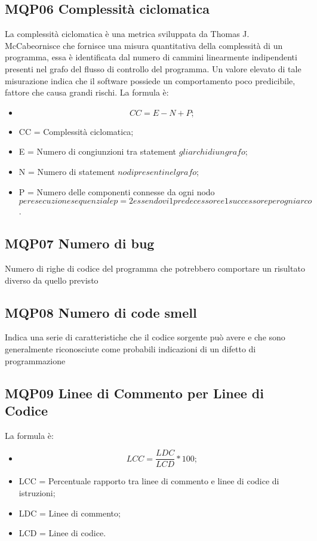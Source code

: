 \subsection{MQP06 Complessità ciclomatica}
La complessità ciclomatica è una metrica sviluppata da Thomas J. McCabeornisce che fornisce una misura quantitativa della complessità di un programma, essa è identificata dal numero di cammini linearmente indipendenti presenti nel grafo del flusso di controllo del programma. Un valore elevato di tale misurazione indica che il software possiede un comportamento poco predicibile, fattore che causa grandi rischi.
La formula è:
\begin{itemize}
  \item[] \[CC 	= E - N + P;\]
  \item CC = Complessità ciclomatica;
  \item E = Numero di congiunzioni tra statement \(gli archi di un grafo\);
  \item N = Numero di statement \(nodi presenti nel grafo\);
  \item P = Numero delle componenti connesse da ogni nodo \(per esecuzione sequenziale p = 2 essendovi 1 predecessore e 1 successore per ogni arco\).
  \end{itemize}


\subsection{MQP07 Numero di bug}
Numero di righe di codice del programma che potrebbero comportare un risultato diverso da quello previsto

\subsection{MQP08 Numero di code smell}
Indica una serie di caratteristiche che il codice sorgente può avere e che sono generalmente riconosciute come probabili indicazioni di un difetto di programmazione

\subsection{MQP09 Linee di Commento per Linee di Codice}
La formula è:
\begin{itemize}
  \item[] \[LCC = \frac{LDC}{LCD} * 100 ;\]
  \item LCC = Percentuale rapporto tra linee di commento e linee di codice di istruzioni;
  \item LDC = Linee di commento;
  \item LCD = Linee di codice.
  \end{itemize}

